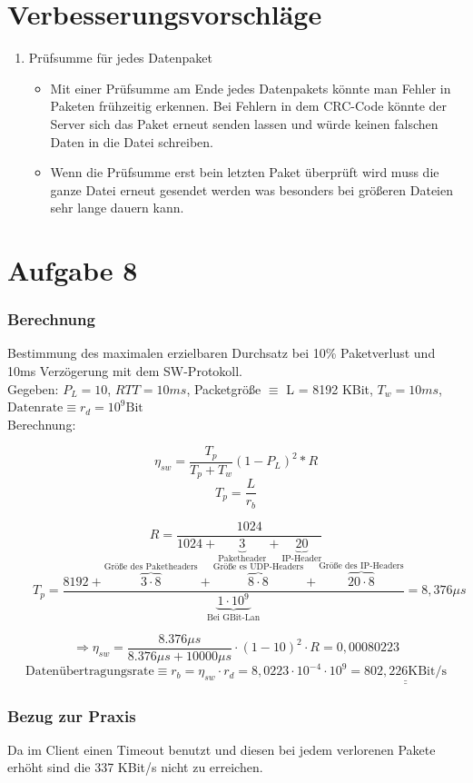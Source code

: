 \documentclass[a4paper, 12pt]{scrartcl}
\begin{document}
\section{Verbesserungsvorschläge}
\begin{enumerate}
\item Prüfsumme für jedes Datenpaket
	\begin{itemize}
	\item Mit einer Prüfsumme am Ende jedes Datenpakets könnte man Fehler in Paketen frühzeitig erkennen. Bei Fehlern in dem CRC-Code könnte der Server sich das Paket erneut senden lassen und würde keinen falschen Daten in die Datei schreiben.
	\item Wenn die Prüfsumme erst bein letzten Paket überprüft wird muss die ganze Datei erneut gesendet werden was besonders bei größeren Dateien sehr lange dauern kann. 
	\end{itemize}
\end{enumerate}
\section*{Aufgabe 8}
\subsubsection*{Berechnung}
Bestimmung des maximalen erzielbaren Durchsatz bei 10\% Paketverlust und 10ms Verzögerung mit dem SW-Protokoll.\\
Gegeben: $P_L = 10$, $RTT = 10ms$, Packetgröße $\equiv$ L = 8192 KBit, $T_w = 10ms$,\\ 
$\text{Datenrate}\equiv r_{d} = 10^9 \text{Bit}$   \\
Berechnung: 
\begin{center}
$$\eta_{sw} = \frac{T_p}{T_p + T_w}\left(1-P_L\right)^2 * R$$
$$T_p = \frac{L}{r_b}$$
	
$$R = \frac{1024}{1024 + \underbrace{3}_{\text{Paketheader}}+\underbrace{20}_{\text{IP-Header}}}$$\newline
$$\qquad T_p = \frac{8192 + \overbrace{3\cdot8}^{\text{Größe des Paketheaders}} + \overbrace{8\cdot8}^{\text{Größe es UDP-Headers}} + \overbrace{20\cdot8}^{\text{Größe des IP-Headers}}}{\underbrace{1 \cdot 10^9}_{\text{Bei GBit-Lan}}} = 8,376 \mu s$$

$$\Rightarrow \eta_{sw} = \frac{8.376\mu s}{8.376\mu s + 10000 \mu s}\cdot(1-10)^2 \cdot R = 0,00080223 $$
$$\text{Datenübertragungsrate} \equiv r_b = \eta_{sw} \cdot r_{d} = 8,0223 \cdot 10^{-4} \cdot 10^9 = \underline{\underline{802,226 \text{KBit/s}}} $$
\end{center}
\subsubsection*{Bezug zur Praxis}
Da im Client einen Timeout benutzt und diesen bei jedem verlorenen Pakete erhöht sind die 337 KBit/s nicht zu erreichen.
\end{document}
